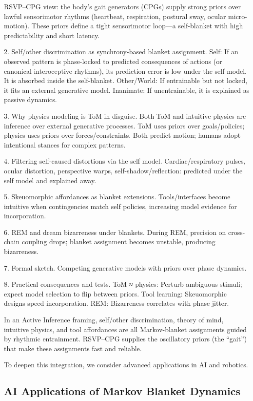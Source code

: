\documentclass{article}
\begin{document}
RSVP--CPG view: the body’s gait generators (CPGs) supply strong priors over lawful sensorimotor rhythms (heartbeat, respiration, postural sway, ocular micro-motion). These priors define a tight sensorimotor loop—a self-blanket with high predictability and short latency.

2. Self/other discrimination as synchrony-based blanket assignment. Self: If an observed pattern is phase-locked to predicted consequences of actions (or canonical interoceptive rhythms), its prediction error is low under the self model. It is absorbed inside the self-blanket. Other/World: If entrainable but not locked, it fits an external generative model. Inanimate: If unentrainable, it is explained as passive dynamics.

3. Why physics modeling is ToM in disguise. Both ToM and intuitive physics are inference over external generative processes. ToM uses priors over goals/policies; physics uses priors over forces/constraints. Both predict motion; humans adopt intentional stances for complex patterns.

4. Filtering self-caused distortions via the self model. Cardiac/respiratory pulses, ocular distortion, perspective warps, self-shadow/reflection: predicted under the self model and explained away.

5. Skeuomorphic affordances as blanket extensions. Tools/interfaces become intuitive when contingencies match self policies, increasing model evidence for incorporation.

6. REM and dream bizarreness under blankets. During REM, precision on cross-chain coupling drops; blanket assignment becomes unstable, producing bizarreness.

7. Formal sketch. Competing generative models with priors over phase dynamics.

8. Practical consequences and tests. ToM ≈ physics: Perturb ambiguous stimuli; expect model selection to flip between priors. Tool learning: Skeuomorphic designs speed incorporation. REM: Bizarreness correlates with phase jitter.

In an Active Inference framing, self/other discrimination, theory of mind, intuitive physics, and tool affordances are all Markov-blanket assignments guided by rhythmic entrainment. RSVP--CPG supplies the oscillatory priors (the “gait”) that make these assignments fast and reliable.

To deepen this integration, we consider advanced applications in AI and robotics.

\subsection{AI Applications of Markov Blanket Dynamics}
\end{document}
